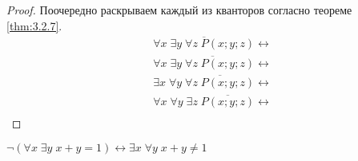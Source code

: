 \begin{proof}
    Поочередно раскрываем каждый из кванторов согласно теореме \ref{thm:3.2.7}.
    \begin{align*}
        &\overline{\forall x \; \exists y \; \forall z \; P(x; y; z)} \leftrightarrow \\
        &\forall x \; \overline{\exists y \; \forall z \; P(x; y; z)} \leftrightarrow \\
        &\exists x \; \forall y \; \overline{\forall z \; P(x; y; z)} \leftrightarrow \\
        &\forall x \; \forall y \; \exists z \;  \overline{P(x; y; z)} \leftrightarrow \\
    \end{align*}
\end{proof}

\begin{example}
    $\neg (\forall x \; \exists y \; x + y = 1) \leftrightarrow \exists x \; \forall y \; x + y \neq 1$
\end{example}

\newpage